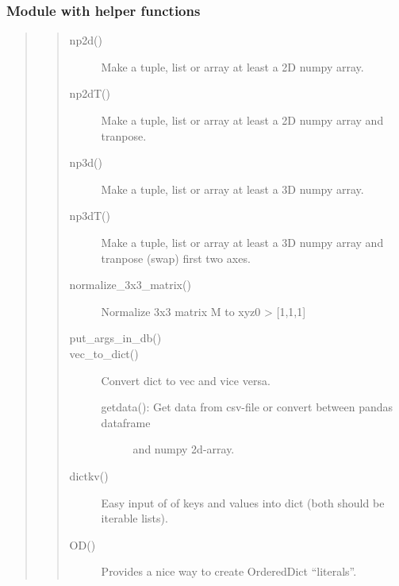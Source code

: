 \documentclass[letterpaper,10pt,english]{sphinxmanual}
\begin{document}
\subsubsection{Module with helper functions}
\label{\detokenize{utils:module-with-helper-functions}}\begin{quote}
\begin{quote}\begin{description}
\item[{np2d()}] \leavevmode
Make a tuple, list or array at least a 2D numpy array.

\item[{np2dT()}] \leavevmode
Make a tuple, list or array at least a 2D numpy array and tranpose.

\item[{np3d()}] \leavevmode
Make a tuple, list or array at least a 3D numpy array.

\item[{np3dT()}] \leavevmode
Make a tuple, list or array at least a 3D numpy array 
and tranpose (swap) first two axes.

\item[{normalize\_3x3\_matrix()}] \leavevmode
Normalize 3x3 matrix M to xyz0 \textendash{} \textgreater{} {[}1,1,1{]}

\item[{put\_args\_in\_db()}] \leavevmode
{}

\item[{vec\_to\_dict()}] \leavevmode
Convert dict to vec and vice versa.
\begin{description}
\item[{getdata(): Get data from csv-file or convert between pandas dataframe}] \leavevmode
and numpy 2d-array.

\end{description}

\item[{dictkv()}] \leavevmode
Easy input of of keys and values into dict 
(both should be iterable lists).

\item[{OD()}] \leavevmode
Provides a nice way to create OrderedDict “literals”.


\end{description}
\end{quote}
\end{quote}
\end{document}
